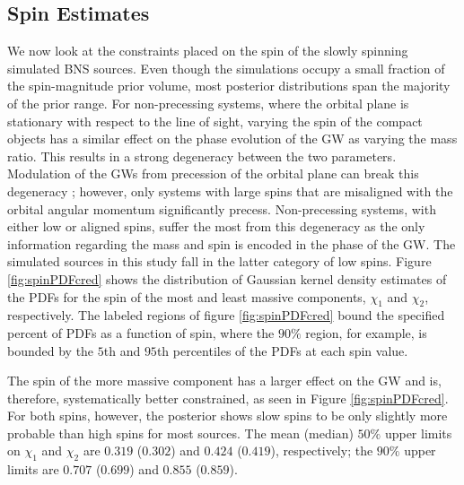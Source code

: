 \subsection{Spin Estimates}\label{sec:spin-magnitudes}
We now look at the constraints placed on the spin of the slowly spinning simulated BNS sources.  Even though the simulations occupy a small fraction of the spin-magnitude prior volume, most posterior distributions span the majority of the prior range. For non-precessing systems, where the orbital plane is stationary with respect to the line of sight, varying the spin of the compact objects has a similar effect on the phase evolution of the GW as varying the mass ratio. This results in a strong degeneracy between the two parameters.  Modulation of the GWs from precession of the orbital plane can break this degeneracy \citep{Vecchio_2004,Lang_2006,Vitale_2014,Chatziioannou_2014}; however, only systems with large spins that are misaligned with the orbital angular momentum significantly precess. Non-precessing systems, with either low or aligned spins, suffer the most from this degeneracy as the only information regarding the mass and spin is encoded in the phase of the GW.  The simulated sources in this study fall in the latter category of low spins.  Figure  \ref{fig:spinPDFcred} shows the distribution of Gaussian kernel density estimates of the PDFs for the spin of the most and least massive components, $\chi_1$ and $\chi_2$, respectively.  The labeled regions of figure \ref{fig:spinPDFcred} bound the specified percent of PDFs as a function of spin, where the $90\%$ region, for example, is bounded by the $5$th and $95$th percentiles of the PDFs at each spin value. 

The spin of the more massive component has a larger effect on the GW and is, therefore, systematically better constrained, as seen in Figure \ref{fig:spinPDFcred}.  For both spins, however, the posterior shows slow spins to be only slightly more probable than high spins for most sources. The mean (median) $50\%$ upper limits on $\chi_1$ and $\chi_2$ are $0.319$ ($0.302$) and $0.424$ ($0.419$), respectively; the $90\%$ upper limits are $0.707$ ($0.699$) and $0.855$ ($0.859$).
  
  
  
  
  
  
  
  
  
  
  
  
  